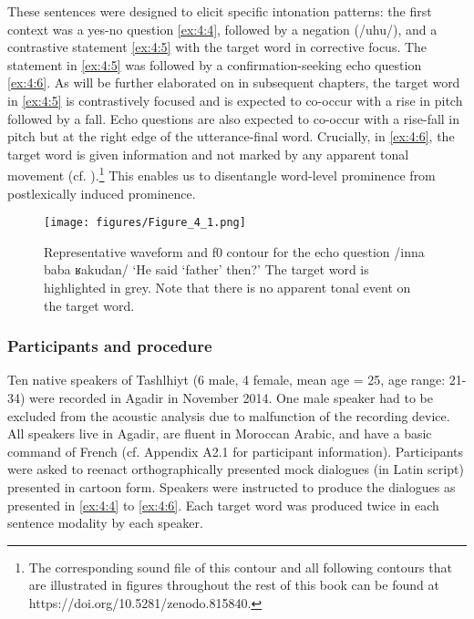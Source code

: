 These sentences were designed to elicit specific intonation patterns: the first context was a yes-no question \ref{ex:4:4}, followed by a negation (/uhu/), and a contrastive statement \ref{ex:4:5} with the target word in corrective focus. The statement in \ref{ex:4:5} was followed by a confirmation-seeking echo question \ref{ex:4:6}. As will be further elaborated on in subsequent chapters, the target word in \ref{ex:4:5} is contrastively focused and is expected to co-occur with a rise in pitch followed by a fall. Echo questions are also expected to co-occur with a rise-fall in pitch but at the right edge of the utterance-final word. Crucially, in \ref{ex:4:6}, the target word is given information and not marked by any apparent tonal movement (cf. ).\footnote{The corresponding sound file of this contour and all following contours that are illustrated in figures throughout the rest of this book can be found at https://doi.org/10.5281/zenodo.815840.} This enables us to disentangle word-level prominence from postlexically induced prominence. 

\begin{figure}
  \centering 
   \texttt{[image: figures/Figure\_4\_1.png]}
  \caption{Representative waveform and f0 contour for the echo question /inna baba ʁakudan/ ‘He said ‘father’ then?’ The target word is highlighted in grey. Note that there is no apparent tonal event on the target word.}
   \label{fig:4.1}
   \end{figure}

\subsubsection{Participants and procedure}
Ten native speakers of Tashlhiyt (6 male, 4 female, mean age = 25, age range: 21-34) were recorded in Agadir in November 2014. One male speaker had to be excluded from the acoustic analysis due to malfunction of the recording device. All speakers live in Agadir, are fluent in Moroccan Arabic, and have a basic command of French (cf. Appendix A2.1 for participant information). Participants were asked to reenact orthographically presented mock dialogues (in Latin script) presented in cartoon form. Speakers were instructed to produce the dialogues as presented in \ref{ex:4:4} to \ref{ex:4:6}. Each target word was produced twice in each sentence modality by each speaker.

